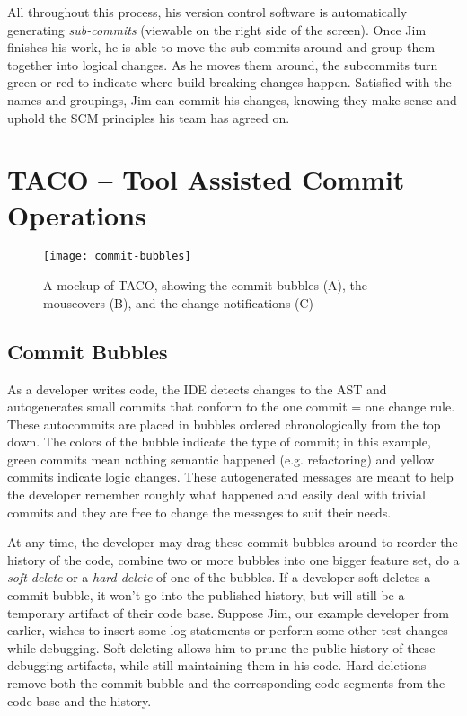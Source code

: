 \documentclass[conference]{IEEEtran}
\begin{document}
All throughout this process, his version control software is automatically generating
\textit{sub-commits} (viewable on the right side of the screen).  
Once Jim finishes his work, he is able to move the sub-commits around and group them together
into logical changes.  
As he moves them around, the subcommits turn green or red to indicate where build-breaking changes
happen.
Satisfied with the names and groupings, Jim can commit his changes, knowing they make sense and
uphold the SCM principles his team has agreed on.



\section{TACO -- Tool Assisted Commit Operations}
\begin{figure}
\centering
\texttt{[image: commit-bubbles]}
\caption{A mockup of TACO, showing the commit bubbles (A), the mouseovers (B),
and the change notifications (C)}
\label{fig:eclipse}
\end{figure}
\subsection{Commit Bubbles}
As a developer writes code, the IDE detects changes to the AST and autogenerates small commits
that conform to the one commit = one change rule.
These autocommits are placed in bubbles ordered chronologically from the top down.
The colors of the bubble indicate the type of commit; in this example, green commits mean nothing
semantic happened (e.g. refactoring) and yellow commits indicate logic changes.
These autogenerated messages are meant to help the developer remember roughly what happened and
easily deal with trivial commits and they are free to change the messages to suit their needs.

At any time, the developer may drag these commit bubbles around to reorder the history of the code,
combine two or more bubbles into one bigger feature set, do a \textit{soft delete}
or a \textit{hard delete} of one of the bubbles.
If a developer soft deletes a commit bubble, it won't go into the published history, but will still be a temporary artifact of their code base.
Suppose Jim, our example developer from earlier, wishes to insert some log statements or perform
some other test changes while debugging.  
Soft deleting allows him to prune the public history of these debugging artifacts, while still maintaining them in his code.
Hard deletions remove both the commit bubble and the corresponding code segments from the code base and the history. 
\end{document}

